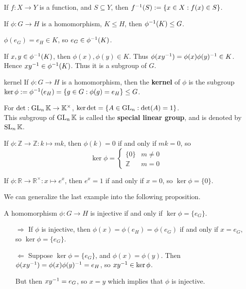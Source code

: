 If $f:X\to Y$ is a function, and $S\subseteq Y$, then $f^{-1} (S):= \{x\in X:f(x)\in S\}$.

\begin{prop}
If $\phi:G\to H$ is a homomorphism, $K\le H$, then $\phi^{-1}(K)\le G$.
\end{prop}

\begin{pf}
$\phi(e_G) = e_H\in K$, so $e_G\in \phi^{-1}(K)$.

If $x,y\in \phi^{-1}(K)$, then $\phi(x),\phi(y)\in K$. Thus $\phi(xy^{-1})=\phi(x)\phi(y)^{-1} \in K$. Hence $xy^{-1}\in \phi^{-1} (K)$. Thus it is a subgroup of $G$.
\end{pf}

\begin{defn}{kernel}
If $\phi: G\to H$ is a homomorphism, then the \textbf{kernel} of $\phi$ is the subgroup $\ker\phi:=\phi^{-1}({e_H})=\{g\in G:\phi(g)=e_H\}\le G$.
\end{defn}

\begin{ex}
For $\det: \operatorname{GL}_n \mathbb K \to \mathbb K^\times$, $\ker \det = \{A\in \operatorname{GL}_n: \det(A)=1\}$.\\
This subgroup of $\operatorname{GL}_n \mathbb K$ is called the \textbf{special linear group}, and is denoted by $\operatorname{SL}_n \mathbb K$.

If $\phi:\mathbb Z\to \mathbb Z: k\mapsto mk$, then $\phi(k)=0$ if and only if $mk=0$, so
$$
\ker \phi=
\begin{cases}
\{0\} & m\ne 0\\
\mathbb Z & m=0
\end{cases}
$$

If $\phi: \mathbb R\to \mathbb R^\times: x\mapsto e^x$, then $e^x=1$ if and only if $x=0$, so $\ker\phi = \{0\}$.
\end{ex}
We can generalize the last example into the following proposition.

\begin{prop}
A homomorphism $\phi:G\to H$ is injective if and only if $\ker\phi = \{e_G\}$.
\end{prop}

\begin{pf}
\begin{itemize}
	\item[$\Rightarrow$] If $\phi$ is injective, then $\phi(x)=\phi(e_H) = \phi(e_G)$ if and only if $x=e_G$, so $\ker\phi=\{e_G\}$.
	
	\item[$\Leftarrow$] Suppose $\ker\phi=\{e_G\}$, and $\phi(x)=\phi(y)$. Then $\phi(xy^{-1}) = \phi(x)\phi(y)^{-1} = e_H$, so $xy^{-1}\in \ker\phi$.
	
	But then $xy^{-1} = e_G$, so $x=y$ which implies that $\phi$ is injective.
	
\end{itemize}
\end{pf}

